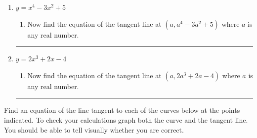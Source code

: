 \begin{ProblemSection}
\begin{embeddedproblem}{}
\begin{enumerate}[label={\bf{}(\alph*)}]
\begin{enumerate}[label={\bf{}(\roman*)}]
      \item Now find the equation of the tangent line at
        $(a,a^3+a^2)$ where $a$ is any real number.
      \end{enumerate}
      \hrule{}
    \item $y=x^4-3x^2+5$
      \begin{enumerate}[label={\bf{}(\roman*)}]
      \item Now find the equation of the tangent line at
        $(a,a^4-3a^2+5)$ where $a$ is any real number.
      \end{enumerate}
      \hrule{}
    \item $y=2x^3+2x-4$
      \begin{enumerate}[label={\bf{}(\roman*)}]
      \item Now find the equation of the tangent line at
        $(a,2a^3+2a-4)$ where $a$ is any real number.
      \end{enumerate}
      \hrule{}
    \end{enumerate}
  \end{embeddedproblem}


  \begin{embeddedproblem}{}
    Find an equation of the line tangent to each of the curves
    below at the points indicated.   To check your calculations graph both the curve and the tangent
    line. You should be able to tell visually whether you are correct.


\end{embeddedproblem}
\end{ProblemSection}
